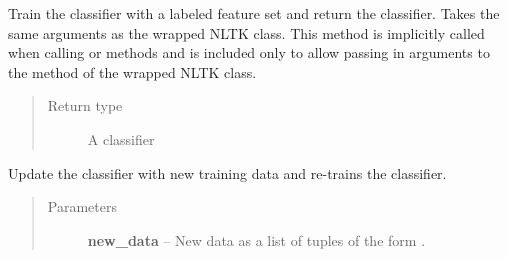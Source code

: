 \documentclass[letterpaper,10pt,english]{sphinxmanual}
\begin{document}
\begin{fulllineitems}
\begin{fulllineitems}
\begin{quote}
\begin{description}
\end{description}\end{quote}

\end{fulllineitems}


\begin{fulllineitems}
\label{api_reference:textblob.classifiers.MaxEntClassifier.train}
Train the classifier with a labeled feature set and return
the classifier. Takes the same arguments as the wrapped NLTK class.
This method is implicitly called when calling  or
 methods and is included only to allow passing in arguments
to the  method of the wrapped NLTK class.

\begin{quote}\begin{description}
\item[{Return type}] \leavevmode
A classifier

\end{description}\end{quote}

\end{fulllineitems}


\begin{fulllineitems}
\label{api_reference:textblob.classifiers.MaxEntClassifier.update}
Update the classifier with new training data and re-trains the
classifier.
\begin{quote}\begin{description}
\item[{Parameters}] \leavevmode
\textbf{new\_data} -- New data as a list of tuples of the form
.

\end{description}\end{quote}

\end{fulllineitems}


\end{fulllineitems}

\end{document}
